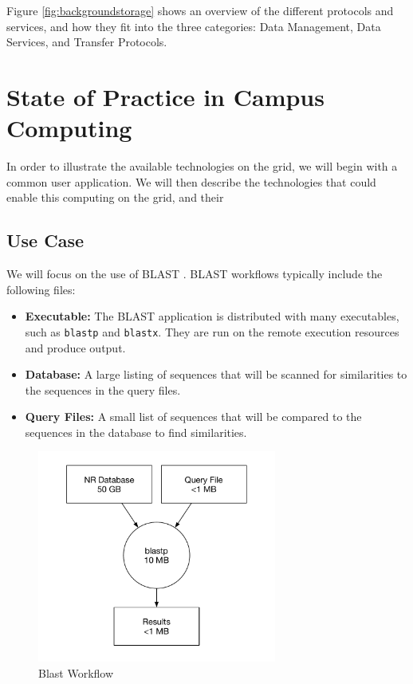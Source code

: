 Figure \ref{fig:backgroundstorage} shows an overview of the different protocols and services, and how they fit into the three categories: Data Management, Data Services, and Transfer Protocols.

\section{State of Practice in Campus Computing}

In order to illustrate the available technologies on the grid, we will begin with a common user application.  We will then describe the technologies that could enable this computing on the grid, and their 

\subsection{Use Case}
We will focus on the use of BLAST \cite{altschul1990basic}.  BLAST workflows typically include the following files:

\begin{itemize}
	\item \textbf{Executable:} The BLAST application is distributed with many executables, such as \texttt{blastp} and \texttt{blastx}.  They are run on the remote execution resources and produce output.
	\item \textbf{Database:}  A large listing of sequences that will be scanned for similarities to the sequences in the query files.
	\item \textbf{Query Files:} A small list of sequences that will be compared to the sequences in the database to find similarities.  
\end{itemize}

\begin{figure}
	\centering
	\includegraphics[width=0.7\textwidth]{images/BlastWorkflow}
	\caption{Blast Workflow}
	\label{fig:blastworkflow}
\end{figure}

